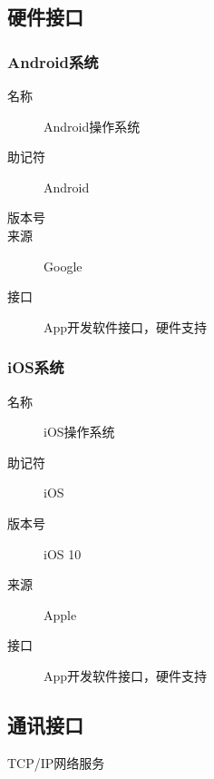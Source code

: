   \subsection{硬件接口}
    \subsubsection{Android系统}
	\begin{center}\begin{description}
      \item[名称] Android操作系统
      \item[助记符] Android
      \item[版本号]
	\item[来源] Google
	\item[接口] App开发软件接口，硬件支持
	\end{description}\end{center}

    \subsubsection{iOS系统}
	\begin{center}\begin{description}
      \item[名称] iOS操作系统
      \item[助记符] iOS
      \item[版本号] iOS 10
	\item[来源] Apple
	\item[接口] App开发软件接口，硬件支持
	\end{description}\end{center}

  \subsection{通讯接口}
	TCP/IP网络服务
